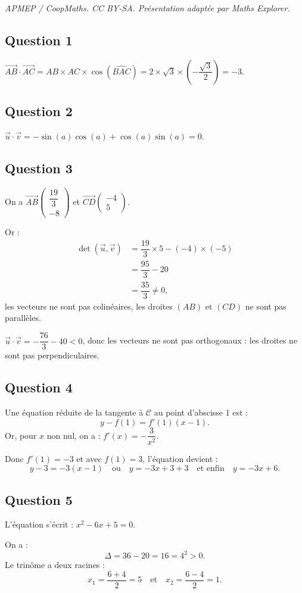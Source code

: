 \documentclass[10pt]{article}
\begin{document}
\noindent\textit{APMEP / CoopMaths. CC BY-SA. Présentation adaptée par Maths Explorer.}\par\medskip
\subsection*{Question 1}

\(\overrightarrow{AB} \cdot \overrightarrow{AC} = AB \times AC \times \cos(\widehat{BAC}) = 2 \times \sqrt{3} \times \left(-\dfrac{\sqrt{3}}{2}\right) = -3\).

\subsection*{Question 2}

\(\vec{u} \cdot \vec{v} = -\sin(a)\cos(a) + \cos(a)\sin(a) = 0\).

\subsection*{Question 3}

On a \(\overrightarrow{AB}\begin{pmatrix} \dfrac{19}{3} \\ -8 \end{pmatrix}\) et \(\overrightarrow{CD}\begin{pmatrix} -4 \\ 5 \end{pmatrix}\).

Or :
\begin{align*}
\det\left(\vec{u}, \vec{v}\right) &= \dfrac{19}{3} \times 5 - (-4) \times (-5) \\
&= \dfrac{95}{3} - 20 \\
&= \dfrac{35}{3} \neq 0,
\end{align*}
les vecteurs ne sont pas colinéaires, les droites \((AB)\) et \((CD)\) ne sont pas parallèles.

\(\vec{u} \cdot \vec{v} = -\dfrac{76}{3} - 40 < 0\), donc les vecteurs ne sont pas orthogonaux : les droites ne sont pas perpendiculaires.

\subsection*{Question 4}

Une équation réduite de la tangente à \(\mathcal{C}\) au point d'abscisse 1 est :
\[
y - f(1) = f'(1)(x - 1).
\]
Or, pour \(x \) non nul, on a : \(f'(x) = -\dfrac{3}{x^2}\).

Donc \(f'(1) = -3\) et avec \(f(1) = 3\), l'équation devient :
\[
y - 3 = -3(x - 1) \quad \text{ou} \quad y = -3x + 3 + 3 \quad \text{et enfin} \quad y = -3x + 6.
\]

\subsection*{Question 5}

L'équation s'écrit : \(x^2 - 6x + 5 = 0\).

On a :
\[
\Delta = 36 - 20 = 16 = 4^2 > 0.
\]
Le trinôme a deux racines :
\[
x_1 = \dfrac{6 + 4}{2} = 5 \quad \text{et} \quad x_2 = \dfrac{6 - 4}{2} = 1.
\]
\end{document}
